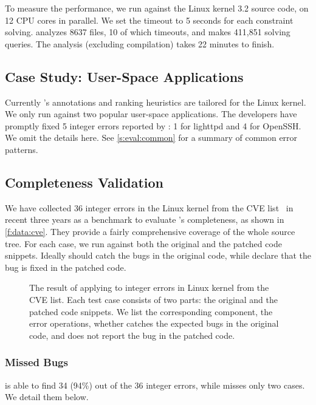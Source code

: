 To measure the performance, we run \sys against the Linux kernel
3.2 source code, on 12 CPU cores in parallel.  We set the timeout
to 5 seconds for each constraint solving.   \sys analyzes 8637 files,
10 of which timeouts, and makes 411,851 solving queries.  The
analysis (excluding compilation) takes 22 minutes to finish.

\subsection{Case Study: User-Space Applications}

Currently \sys's annotations and ranking heuristics are tailored
for the Linux kernel.  We only run \sys against two popular user-space
applications.  The developers have promptly fixed 5 integer errors
reported by \sys: 1 for lighttpd and 4 for OpenSSH.  We omit the
details here.  See \autoref{s:eval:common} for a summary of common
error patterns.

\subsection{Completeness Validation}

We have collected 36 integer errors in the Linux kernel from the
CVE list~\cite{cve} in recent three years as a benchmark to evaluate
\sys's completeness, as shown in \autoref{f:data:cve}.  They provide
a fairly comprehensive coverage of the whole source tree.  For each
case, we run \sys against both the original and the patched code
snippets.  Ideally \sys should catch the bugs in the original code,
while declare that the bug is fixed in the patched code.

\begin{figure*}
\centering
\footnotesize

\caption{The result of applying \sys to integer errors in Linux
kernel from the CVE list.  Each test case consists of two parts:
the original and the patched code snippets.  We list the corresponding
component, the error operations, whether \sys catches the expected
bugs in the original code, and does not report the bug in the patched
code.}
\label{f:data:cve}
\end{figure*}

\subsubsection{Missed Bugs}

\sys is able to find 34 (94\%) out of the 36 integer errors, while
misses only two cases.  We detail them below.

